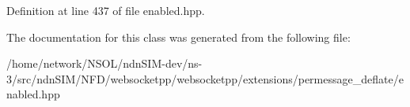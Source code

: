 Definition at line 437 of file enabled.\+hpp.



The documentation for this class was generated from the following file\+:\begin{DoxyCompactItemize}
\item 
/home/network/\+N\+S\+O\+L/ndn\+S\+I\+M-\/dev/ns-\/3/src/ndn\+S\+I\+M/\+N\+F\+D/websocketpp/websocketpp/extensions/permessage\+\_\+deflate/enabled.\+hpp\end{DoxyCompactItemize}
